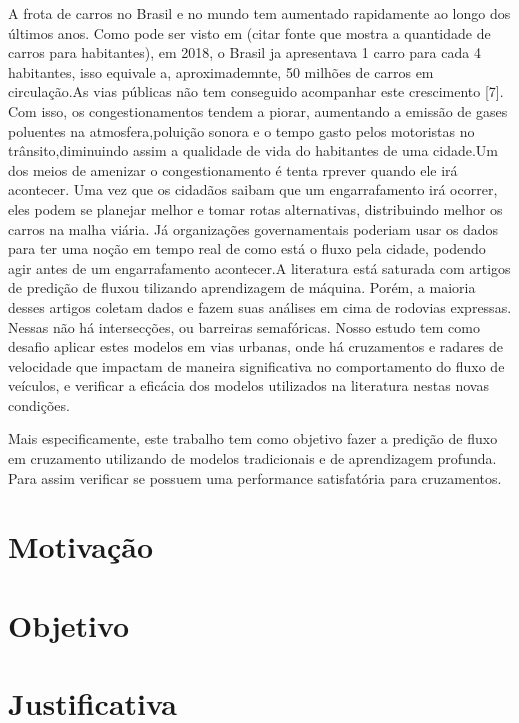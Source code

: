 
A frota  de  carros no Brasil e no mundo  tem  aumentado rapidamente ao  longo  dos  últimos anos. Como pode ser visto em (citar fonte que mostra a quantidade de carros para habitantes), em 2018, o Brasil ja apresentava 1 carro para cada 4 habitantes, isso equivale a, aproximademnte, 50 milhões de carros em circulação.As vias públicas não tem conseguido acompanhar este crescimento  [7].  Com  isso,  os  congestionamentos  tendem  a piorar, aumentando a emissão de gases poluentes na atmosfera,poluição sonora e o tempo gasto pelos motoristas no trânsito,diminuindo  assim  a  qualidade  de  vida  do  habitantes  de  uma cidade.Um  dos  meios  de  amenizar  o  congestionamento  é  tenta rprever  quando  ele  irá  acontecer.  Uma  vez  que  os  cidadãos saibam  que  um  engarrafamento  irá  ocorrer,  eles  podem  se planejar melhor e tomar rotas alternativas, distribuindo melhor os  carros  na  malha  viária.  Já  organizações  governamentais poderiam  usar  os  dados  para  ter  uma  noção  em  tempo  real de  como está  o  fluxo pela  cidade,  podendo agir  antes de  um engarrafamento acontecer.A literatura está saturada com artigos de predição de fluxou tilizando aprendizagem de máquina. Porém, a maioria desses artigos  coletam  dados  e  fazem  suas  análises  em  cima  de rodovias  expressas.  Nessas  não  há  intersecções,  ou  barreiras semafóricas.  Nosso  estudo  tem  como  desafio  aplicar  estes modelos  em  vias  urbanas,  onde  há  cruzamentos  e  radares  de velocidade que impactam de maneira significativa no comportamento do fluxo de veículos, e verificar a eficácia dos modelos utilizados na literatura nestas novas condições.

Mais especificamente, este trabalho tem como objetivo fazer a  predição  de  fluxo  em  cruzamento  utilizando  de  modelos tradicionais e de aprendizagem profunda. Para assim verificar se possuem uma performance satisfatória para cruzamentos.
\section{Motivação}

\section{Objetivo}

\section{Justificativa}

